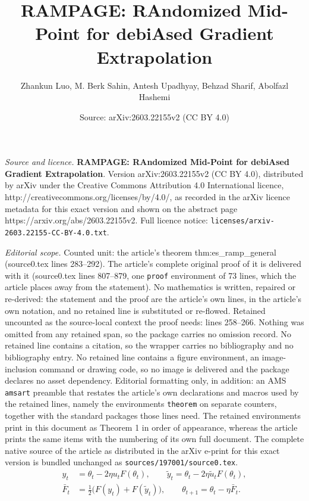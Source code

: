 \documentclass[10pt,a4paper]{amsart}
\title{\vspace{-10mm}\textbf{RAMPAGE: RAndomized Mid-Point for debiAsed Gradient Extrapolation}}
\author{Zhankun Luo, M. Berk Sahin, Antesh Upadhyay, Behzad Sharif, Abolfazl Hashemi}
\date{Source: arXiv:2603.22155v2 (CC BY 4.0)}
\begin{document}
\maketitle

\noindent\emph{Source and licence.} \vspace{-10mm}\textbf{RAMPAGE: RAndomized Mid-Point for debiAsed Gradient Extrapolation}. Version arXiv:2603.22155v2 (CC BY 4.0), distributed by arXiv under the Creative Commons Attribution 4.0 International licence, http://creativecommons.org/licenses/by/4.0/, as recorded in the arXiv licence metadata for this exact version and shown on the abstract page https://arxiv.org/abs/2603.22155v2. Full licence notice: \texttt{licenses/arxiv-2603.22155-CC-BY-4.0.txt}.\par\smallskip

\noindent\textit{Editorial scope.} Counted unit: the article's theorem thm:es\_ramp\_general (source0.tex lines 283--292). The article's complete original proof of it is delivered with it (source0.tex lines 807--879, one \texttt{proof} environment of 73 lines, which the article places away from the statement). No mathematics is written, repaired or re-derived: the statement and the proof are the article's own lines, in the article's own notation, and no retained line is substituted or re-flowed.  Retained uncounted as the source-local context the proof needs: lines 258--266.  Nothing was omitted from any retained span, so the package carries no omission record.  No retained line contains a citation, so the wrapper carries no bibliography and no bibliography entry.  No retained line contains a figure environment, an image-inclusion command or drawing code, so no image is delivered and the package declares no asset dependency.  Editorial formatting only, in addition: an AMS \texttt{amsart} preamble that restates the article's own declarations and macros used by the retained lines, namely the environments \texttt{theorem} on separate counters, together with the standard packages those lines need.  The retained environments print in this document as Theorem 1 in order of appearance, whereas the article prints the same items with the numbering of its own full document.  The complete native source of the article as distributed in the arXiv e-print for this exact version is bundled unchanged as \texttt{sources/197001/source0.tex}.
\begin{equation} \label{eq:rampage+}
\tag{RAMPAGE+}
\begin{aligned}
y_t &= \theta_t - 2\eta u_t F(\theta_t), \qquad
\tilde{y}_t = \theta_t - 2\eta \tilde{u}_t F(\theta_t), \\
\bar{F}_t &= \frac{1}{2} \big( F(y_t) + F(\tilde{y}_t) \big), \qquad
\theta_{t+1} = \theta_t - \eta \bar{F}_t.
\end{aligned}
\end{equation}
\end{document}
